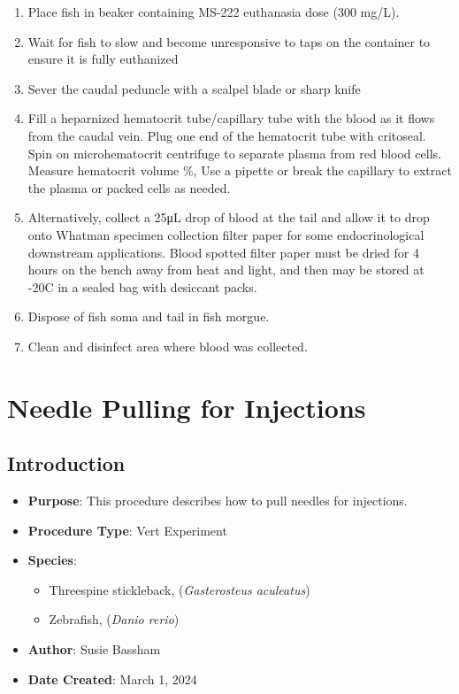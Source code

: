 \documentclass[
  letterpaper,
  DIV=11,
  numbers=noendperiod]{scrreprt}
\providecommand{\tightlist}{%
  \setlength{\itemsep}{0pt}\setlength{\parskip}{0pt}}\usepackage{longtable,booktabs,array}
\begin{document}
\begin{enumerate}
\def\labelenumi{\arabic{enumi}.}
\tightlist
\item
  Place fish in beaker containing MS-222 euthanasia dose (300 mg/L).
\item
  Wait for fish to slow and become unresponsive to taps on the container
  to ensure it is fully euthanized
\item
  Sever the caudal peduncle with a scalpel blade or sharp knife
\item
  Fill a heparnized hematocrit tube/capillary tube with the blood as it
  flows from the caudal vein. Plug one end of the hematocrit tube with
  critoseal. Spin on microhematocrit centrifuge to separate plasma from
  red blood cells. Measure hematocrit volume \%, Use a pipette or break
  the capillary to extract the plasma or packed cells as needed.
\item
  Alternatively, collect a 25μL drop of blood at the tail and allow it
  to drop onto Whatman specimen collection filter paper for some
  endocrinological downstream applications. Blood spotted filter paper
  must be dried for 4 hours on the bench away from heat and light, and
  then may be stored at -20C in a sealed bag with desiccant packs.
\item
  Dispose of fish soma and tail in fish morgue.
\item
  Clean and disinfect area where blood was collected.
\end{enumerate}

\hypertarget{sec-vert_exp-needle_pulling}{%
\chapter{Needle Pulling for
Injections}\label{sec-vert_exp-needle_pulling}}

\hypertarget{introduction-70}{%
\section{Introduction}\label{introduction-70}}

\begin{itemize}
\tightlist
\item
  \textbf{Purpose}: This procedure describes how to pull needles for
  injections.
\item
  \textbf{Procedure Type}: Vert Experiment
\item
  \textbf{Species}:

  \begin{itemize}
  \tightlist
  \item
    Threespine stickleback, (\emph{Gasterosteus aculeatus})
  \item
    Zebrafish, (\emph{Danio rerio})
  \end{itemize}
\item
  \textbf{Author}: Susie Bassham
\item
  \textbf{Date Created}: March 1, 2024
\end{itemize}
\end{document}
